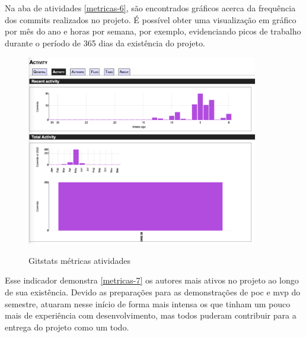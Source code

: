 \pagebreak

\begin{itemize}

\end{itemize}

Na aba de atividades \autoref{metricas-6}, são encontrados gráficos acerca da frequência dos commits realizados no projeto. É possível obter uma visualização em gráfico por mês do ano e horas por semana, por exemplo, evidenciando picos de trabalho durante o período de 365 dias da existência do projeto.

\begin{figure}[htb]
	\centering
	\caption{\label{fig_arq_virado}Gitstats métricas atividades}
	\includegraphics[width=0.90\textwidth]{anexos/metricas6.png}
	\label{metricas-6}
\end{figure}

Esse indicador demonstra \autoref{metricas-7} os autores mais ativos no projeto ao longo de sua existência. Devido as preparações para as demonstrações de \ac{poc} e \ac{mvp} do semestre, atuaram nesse início de forma mais intensa os que tinham um pouco mais de experiência com desenvolvimento, mas todos puderam contribuir para a entrega do projeto como um todo. 

